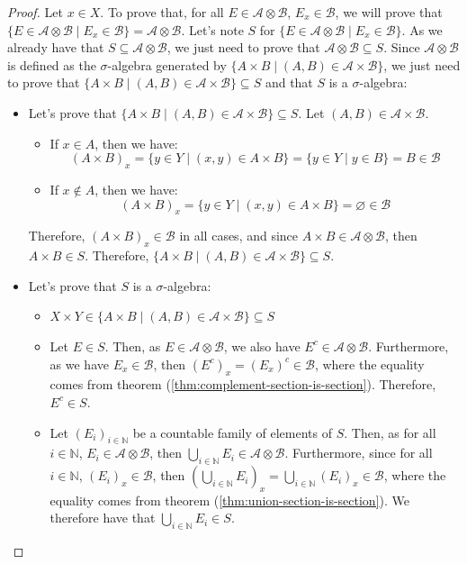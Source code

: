 \documentclass{article}
\theoremstyle{definition}
\theoremstyle{remark}
\theoremstyle{example}
\theoremstyle{notation}
\theoremstyle{axiom}
\begin{document}
\begin{proof}
		Let $x \in X$. To prove that, for all $E \in \mathcal{A} \otimes \mathcal{B}$, $E_x \in \mathcal{B}$, we will prove that $\{E \in \mathcal{A} \otimes \mathcal{B} \mid E_x \in \mathcal{B}\} = \mathcal{A} \otimes \mathcal{B}$. Let's note $S$ for $\{E \in \mathcal{A} \otimes \mathcal{B} \mid E_x \in \mathcal{B}\}$. As we already have that $S \subseteq \mathcal{A} \otimes \mathcal{B}$, we just need to prove that $\mathcal{A} \otimes \mathcal{B} \subseteq S$. Since $\mathcal{A} \otimes \mathcal{B}$ is defined as the $\sigma$-algebra generated by $\{A \times B \mid (A, B) \in \mathcal{A} \times \mathcal{B}\}$, we just need to prove that $\{A \times B \mid (A, B) \in \mathcal{A} \times \mathcal{B}\} \subseteq S$ and that $S$ is a $\sigma$-algebra:
		\begin{itemize}
				\item Let's prove that  $\{A \times B \mid (A, B) \in \mathcal{A} \times \mathcal{B}\} \subseteq S$. Let $(A, B) \in \mathcal{A} \times \mathcal{B}$. 
				\begin{itemize}
						\item If $x \in A$, then we have:
								$$(A \times B)_x = \{y \in Y \mid (x, y) \in A \times B\} = \{y \in Y \mid y \in B\} = B \in \mathcal{B}$$
						\item If $x \notin A$, then we have:
								$$(A \times B)_x = \{y \in Y \mid (x, y) \in A \times B\} = \varnothing \in \mathcal{B}$$
				\end{itemize}
				Therefore, $(A \times B)_x \in \mathcal{B}$ in all cases, and since $A \times B \in \mathcal{A} \otimes \mathcal{B}$, then $A \times B \in S$. Therefore, $\{A \times B \mid (A, B) \in \mathcal{A} \times \mathcal{B}\} \subseteq S$.
				\item Let's prove that $S$ is a $\sigma$-algebra:
				\begin{itemize}
						\item $X \times Y \in \{A \times B \mid (A, B) \in \mathcal{A} \times \mathcal{B}\} \subseteq S$
						\item Let $E \in S$. Then, as $E \in \mathcal{A} \otimes \mathcal{B}$, we also have $E^c \in \mathcal{A} \otimes \mathcal{B}$. Furthermore, as we have $E_x \in \mathcal{B}$, then $(E^c)_x = (E_x)^c \in \mathcal{B}$, where the equality comes from theorem (\ref{thm:complement-section-is-section}). Therefore, $E^c \in S$.
						\item Let $(E_i)_{i\in\mathbb{N}}$ be a countable family of elements of $S$. Then, as for all $i \in \mathbb{N}$, $E_i \in \mathcal{A} \otimes \mathcal{B}$, then $\bigcup_{i \in \mathbb{N}} E_i \in \mathcal{A} \otimes \mathcal{B}$. Furthermore, since for all $i \in \mathbb{N}$, $(E_i)_x \in \mathcal{B}$, then $(\bigcup_{i\in\mathbb{N}} E_i)_x = \bigcup_{i\in\mathbb{N}} (E_i)_x \in \mathcal{B}$, where the equality comes from theorem (\ref{thm:union-section-is-section}). We therefore have that $\bigcup_{i\in\mathbb{N}} E_i \in S$.

\end{itemize}
\end{itemize}
\end{proof}
\end{document}

